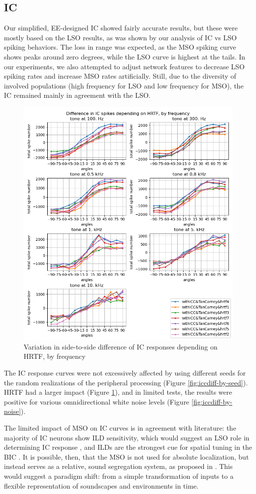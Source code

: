 \documentclass[11pt,a4paper]{article}
\begin{document}
\subsection{IC}
Our simplified, EE-designed IC showed fairly accurate results, but these were mostly based on the LSO results, as was shown by our analysis of IC vs LSO spiking behaviors. The loss in range was expected, as the MSO spiking curve shows peaks around zero degrees, while the LSO curve is highest at the tails. In our experiments, we also attempted to adjust network features to decrease LSO spiking rates and increase MSO rates artificially. Still, due to the diversity of involved populations (high frequency for LSO and low frequency for MSO), the IC remained mainly in agreement with the LSO.
\begin{figure}[H]
    \centering
    \includegraphics[width=0.75\linewidth]{Images/ICdiffbyHRTF.png}
    \caption{Variation in side-to-side difference of IC responses depending on HRTF, by frequency}
    \label{fig:iccdiff-by-HRTF}
\end{figure}

The IC response curves were not excessively affected by using different seeds for the random realizations of the peripheral processing (Figure \ref{fig:iccdiff-by-seed}). HRTF had a larger impact (Figure \ref{fig:iccdiff-by-HRTF}), and in limited tests, the results were positive for various omnidirectional white noise levels (Figure \ref{fig:iccdiff-by-noise}).

The limited impact of MSO on IC curves is in agreement with literature: the majority of IC neurons show ILD sensitivity, which would suggest an LSO role in determining IC response \cite{grotheMechanismsSoundLocalization2010}, and ILDs are the strongest cue for spatial tuning in the BIC \cite{sleeLinearProcessingInteraural2013}. It is possible, then, that the MSO is not used for absolute localization, but instead serves as a relative, sound segregation system, as proposed in \cite{grotheNaturalHistorySound2014}. This would suggest a paradigm shift: from a simple transformation of inputs to a flexible representation of soundscapes and environments in time.
\end{document}
